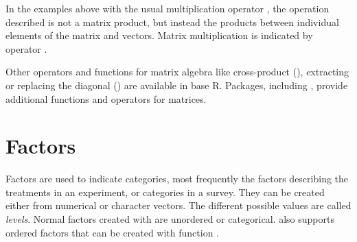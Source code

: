 \documentclass[krantz2]{krantz}\usepackage{knitr}%
\begin{document}
In the examples above with the usual multiplication operator \code{*}, the operation described is not a matrix product, but instead the products between individual elements of the matrix and vectors. Matrix multiplication is indicated by operator \Roperator{\%*\%}.

\begin{knitrout}\footnotesize
{}\color{fgcolor}
\end{knitrout}

Other operators and functions for matrix algebra like cross-product (), extracting or replacing the diagonal () are available in base R. Packages, including , provide additional functions and operators for matrices.




\section{Factors}\label{sec:calc:factors}
Factors are used to indicate categories, most frequently the factors describing the treatments in an experiment, or categories in a survey. They can be created either from numerical or character vectors. The different possible values are called \emph{levels}. Normal factors created with  are unordered or categorical. \Rlang also supports ordered factors that can be created with function .
\end{document}
